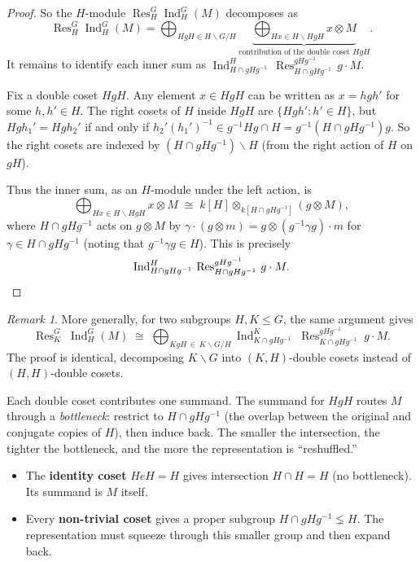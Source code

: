 \documentclass[12pt,a4paper]{article}
\theoremstyle{definition}
\theoremstyle{remark}
\newtheorem{remark}[theorem]{Remark}
\newcommand{\Ind}{\operatorname{Ind}}
\newcommand{\Res}{\operatorname{Res}}
\begin{document}
\begin{proof}
So the $H$-module $\Res_H^G \Ind_H^G(M)$ decomposes as
\[
  \Res_H^G \Ind_H^G(M)
  = \bigoplus_{HgH \in H \backslash G / H}
  \underbrace{\bigoplus_{Hx \in H \backslash HgH} x \otimes M}_{
    \text{contribution of the double coset } HgH}.
\]
It remains to identify each inner sum as
$\Ind_{H \cap gHg^{-1}}^{H}\, \Res_{H \cap gHg^{-1}}^{gHg^{-1}}\,
g \cdot M$.

Fix a double coset $HgH$. Any element $x \in HgH$ can be written as
$x = h g h'$ for some $h, h' \in H$. The right cosets of $H$ inside
$HgH$ are $\{Hg h' : h' \in H\}$, but $Hgh_1' = Hgh_2'$ if and only
if $h_2' (h_1')^{-1} \in g^{-1}Hg \cap H = g^{-1}(H \cap gHg^{-1})g$.
So the right cosets are indexed by
$(H \cap gHg^{-1}) \backslash H$ (from the right action of $H$ on $gH$).

Thus the inner sum, as an $H$-module under the left action, is
\[
  \bigoplus_{Hx \in H \backslash HgH} x \otimes M
  \;\cong\;
  k[H] \otimes_{k[H \cap gHg^{-1}]} (g \otimes M),
\]
where $H \cap gHg^{-1}$ acts on $g \otimes M$ by
$\gamma \cdot (g \otimes m) = g \otimes (g^{-1}\gamma g) \cdot m$
for $\gamma \in H \cap gHg^{-1}$ (noting that $g^{-1}\gamma g \in H$).
This is precisely
\[
  \Ind_{H \cap gHg^{-1}}^{H}\, \Res_{H \cap gHg^{-1}}^{gHg^{-1}}\,
  g \cdot M. \qedhere
\]
\end{proof}

\begin{remark}
More generally, for two subgroups $H, K \leqslant G$, the same
argument gives
\[
  \Res_K^G\;\Ind_H^G(M)
  \;\cong\;
  \bigoplus_{KgH \,\in\, K \backslash G / H}
  \Ind_{K \cap gHg^{-1}}^{K}\;
  \Res_{K \cap gHg^{-1}}^{gHg^{-1}}\;
  g \cdot M.
\]
The proof is identical, decomposing $K \backslash G$ into
$(K, H)$-double cosets instead of $(H, H)$-double cosets.
\end{remark}

Each double coset contributes one summand. The summand for $HgH$
routes $M$ through a \emph{bottleneck}: restrict to $H \cap gHg^{-1}$
(the overlap between the original and conjugate copies of $H$), then
induce back. The smaller the intersection, the tighter the bottleneck,
and the more the representation is ``reshuffled.''

\begin{itemize}
\item The \textbf{identity coset} $HeH = H$ gives intersection
  $H \cap H = H$ (no bottleneck). Its summand is $M$ itself.
\item Every \textbf{non-trivial coset} gives a proper subgroup
  $H \cap gHg^{-1} \lneq H$. The representation must squeeze through
  this smaller group and then expand back.
\end{itemize}
\end{document}
